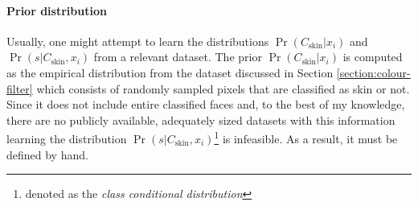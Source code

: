 \paragraph{Prior distribution}
Usually, one might attempt to learn the distributions $\Pr(C_\mathrm{skin}|x_i)$ and $\Pr(s|C_\mathrm{skin}, x_i)$ from a relevant dataset.
The prior $\Pr(C_\mathrm{skin}|x_i)$ is computed as the empirical distribution from 
the dataset discussed in Section \ref{section:colour-filter} which consists of randomly sampled pixels that are classified as skin or not. Since it does not include entire classified faces and, to the best of my knowledge, there are no publicly available, adequately sized datasets with this information learning the distribution $\Pr(s|C_\mathrm{skin}, x_i)$\footnote{denoted as the \textit{class conditional distribution}} is infeasible. As a result, it must be defined by hand.

